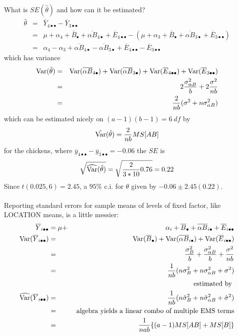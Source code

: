 What is $SE(\hat\theta)$ and how can it be estimated?
\begin{eqnarray*}
\hat\theta &=& \bar{Y}_{4\bullet\bullet}-\bar{Y}_{3\bullet\bullet} \\
&=&\mu+\alpha_4 + \bar{B}_{\bullet} + \overline{\alpha B}_{4\bullet} + \overline{E}_{4\bullet\bullet} -(\mu+\alpha_3 + \bar{B}_{\bullet} + \overline{\alpha B}_{3\bullet} + \overline{E}_{3\bullet\bullet}) \\
&=& \alpha_4 -\alpha_3 + \overline{\alpha B}_{4\bullet} - \overline{\alpha B}_{3\bullet} + \overline{E}_{4\bullet\bullet} - \overline{E}_{3\bullet\bullet} 
\end{eqnarray*} 
which has variance
\begin{eqnarray*} 
\mbox{Var}(\hat\theta)&=& \mbox{Var}(\overline{\alpha B}_{4\bullet}) + \mbox{Var}(\overline{\alpha B}_{3\bullet}) 
+ \mbox{Var}(\overline{E}_{4\bullet\bullet}) + \mbox{Var}(\overline{E}_{3\bullet\bullet}) \\ 
 &=& 2 \frac{\sigma_{\alpha B}^2}{b} + 2 \frac{\sigma^2}{nb} \\
 &=& \frac{2}{nb} (\sigma^2 + n \sigma_{\alpha B}^2)
\end{eqnarray*} 
which can be estimated nicely on $(a-1)(b-1)=6~df$ by
$$\hat{\mbox{Var}}(\hat\theta) = \frac{2}{nb} MS[AB]$$
for the chickens, where $\overline{y}_{4\bullet\bullet} - \overline{y}_{3\bullet\bullet}=-0.06$ the $SE$ is
$$\sqrt{\widehat{\mbox{Var}}(\hat\theta)} = \sqrt{\frac{2}{3*10} 0.76} = 0.22$$
Since $t(0.025,6) =2.45$, a $95\%$ c.i. for $\theta$ given by $-0.06 \pm 2.45(0.22)$.\\~\\
Reporting standard errors for sample means of levels of fixed factor, like LOCATION means, is a little messier:
\begin{eqnarray*}
\overline{Y}_{i\bullet\bullet} &= \mu + & \alpha_i + \overline{B}_{\bullet} + \overline{\alpha B}_{i\bullet} + \overline{E}_{i\bullet\bullet} \\
\mbox{Var}(\overline{Y}_{i\bullet\bullet}) &=& \mbox{Var}(\overline{B}_{\bullet}) + \mbox{Var}(\overline{\alpha B}_{i\bullet}) + \mbox{Var}(\overline{E}_{i\bullet\bullet}) \\
& = & \frac{\sigma_B^2}{b} + \frac{\sigma_{\alpha B}^2}{b} + \frac{\sigma^2}{nb} \\
& = & \frac{1}{nb}(n\sigma_B^2 + n \sigma_{\alpha B}^2 + \sigma^2)\\
& & \mbox{ estimated by } \\
\widehat{\mbox{Var}}(\overline{Y}_{i\bullet\bullet}) &=& 
\frac{1}{nb}(n\hat\sigma_B^2 + n \hat\sigma_{\alpha B}^2 + \hat\sigma^2) \\
& = & \mbox{ algebra yields a linear combo of multiple EMS terms} \\
& = & \frac{1}{nab}\{(a-1)MS[AB] + MS[B]\}
\end{eqnarray*}
